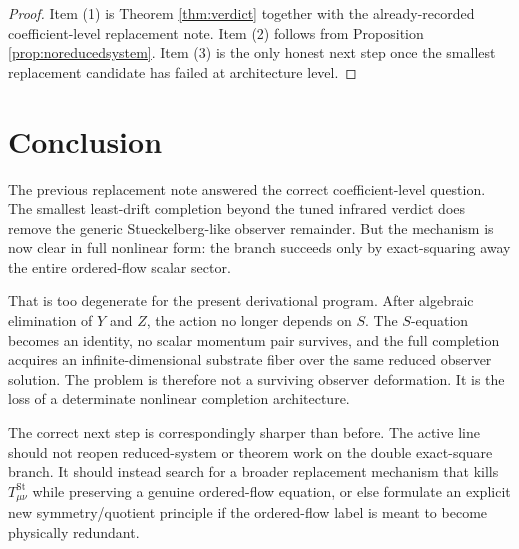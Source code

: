 \documentclass[11pt]{article}
\begin{document}
\begin{proof}
Item (1) is Theorem \ref{thm:verdict} together with the already-recorded coefficient-level replacement note. Item (2) follows from Proposition \ref{prop:noreducedsystem}. Item (3) is the only honest next step once the smallest replacement candidate has failed at architecture level.
\end{proof}

\section{Conclusion}

The previous replacement note answered the correct coefficient-level question. The smallest least-drift completion beyond the tuned infrared verdict does remove the generic Stueckelberg-like observer remainder. But the mechanism is now clear in full nonlinear form: the branch succeeds only by exact-squaring away the entire ordered-flow scalar sector.

That is too degenerate for the present derivational program. After algebraic elimination of \(Y\) and \(Z\), the action no longer depends on \(S\). The \(S\)-equation becomes an identity, no scalar momentum pair survives, and the full completion acquires an infinite-dimensional substrate fiber over the same reduced observer solution. The problem is therefore not a surviving observer deformation. It is the loss of a determinate nonlinear completion architecture.

The correct next step is correspondingly sharper than before. The active line should not reopen reduced-system or theorem work on the double exact-square branch. It should instead search for a broader replacement mechanism that kills \(T_{\mu\nu}^{\mathrm{St}}\) while preserving a genuine ordered-flow equation, or else formulate an explicit new symmetry/quotient principle if the ordered-flow label is meant to become physically redundant.
\end{document}
